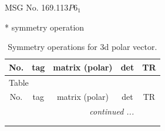 \documentclass[fleqn,8pt]{jsarticle}
\begin{document}
\setcounter{MaxMatrixCols}{32}

\renewcommand{\tablename}{Table~}
\renewcommand{\figurename}{Figure~}
\begin{center}
\LARGE
MSG No. 169.113\quad$P6_{1}$
\end{center}
* symmetry operation
\renewcommand{\arraystretch}{1.3}
\begin{longtable}{ccccc}
\caption{Symmetry operations for 3d polar vector.}
 \\
 \hline \hline
No. & tag & matrix (polar) & det & TR \\ \hline \endfirsthead

\multicolumn{4}{l}{\tablename\ \thetable{}} \\
 \hline \hline
No. & tag & matrix (polar) & det & TR \\ \hline \endhead

 \hline \hline
\multicolumn{4}{r}{\footnotesize\it continued ...} \\ \endfoot

 \hline \hline
\multicolumn{4}{r}{} \\ \endlastfoot


\end{longtable}
\end{document}
